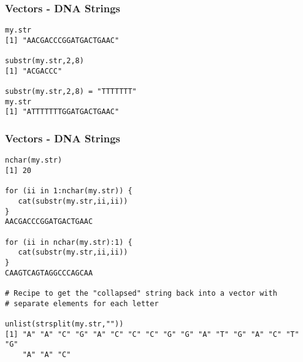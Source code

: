 \documentclass{beamer}
\begin{document}
\begin{frame}[fragile]
\frametitle{Vectors - DNA Strings}
\small
\begin{verbatim}
my.str
[1] "AACGACCCGGATGACTGAAC"

substr(my.str,2,8)
[1] "ACGACCC"

substr(my.str,2,8) = "TTTTTTT"
my.str
[1] "ATTTTTTTGGATGACTGAAC"
\end{verbatim}
\end{frame}

\begin{frame}[fragile]
\frametitle{Vectors - DNA Strings}
\footnotesize
\begin{verbatim}
nchar(my.str)
[1] 20

for (ii in 1:nchar(my.str)) {
   cat(substr(my.str,ii,ii))
}
AACGACCCGGATGACTGAAC

for (ii in nchar(my.str):1) {
   cat(substr(my.str,ii,ii))
}
CAAGTCAGTAGGCCCAGCAA

# Recipe to get the "collapsed" string back into a vector with 
# separate elements for each letter

unlist(strsplit(my.str,""))
[1] "A" "A" "C" "G" "A" "C" "C" "C" "G" "G" "A" "T" "G" "A" "C" "T" "G" 
    "A" "A" "C"
\end{verbatim}
\end{frame}

\end{document}
